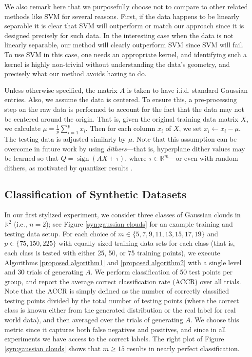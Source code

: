 \documentclass[twoside,11pt]{article}
\def \R {\mathbb{R}}
\DeclareMathOperator*{\sign}{sign}
\newcommand{\edit}[1]{{{#1}}}
\begin{document}
\edit{We also remark here that we purposefully choose not to compare to other related methods like SVM for several reasons. First, if the data happens to be linearly separable it is clear that SVM will outperform or match our approach since it is designed precisely for such data.  In the interesting case when the data is not linearly separable, our method will clearly outperform SVM since SVM will fail. To use SVM in this case, one needs an appropriate kernel, and identifying such a kernel is highly non-trivial without understanding the data's geometry, and precisely what our method avoids having to do.}

\edit{Unless otherwise specified}, the matrix $A$ is taken to have i.i.d. standard Gaussian entries. Also, we assume the data is centered. To ensure this, a pre-processing step on the raw data is performed to account for the fact that the data may not be centered around the origin. That is, given the original training data matrix $X$, we calculate $\mu = \frac{1}{p} \sum_{i=1}^p x_i$. Then for each column $x_i$ of $X$, we set $x_i \leftarrow x_i - \mu$. The testing data is adjusted similarly by $\mu$. Note that this assumption can be overcome in future work by using \textit{dithers}---that is, hyperplane dither values may be learned so that $Q = \sign(AX + \tau)$, where $\tau\in\R^m$---or \edit{even with random dithers, as motivated by quantizer results  \citep{exponentialBFNPW14,cambareri2017rare}}.

\subsection{Classification of Synthetic Datasets}
In our first stylized experiment, we consider three classes of Gaussian clouds in $\R^2$ (i.e., $n=2$); see Figure \ref{syn:gaussian clouds} for an example training and testing data setup. For each choice of $m\in\{5,7,9,11,13,15,17,19\}$ and $p\in\{75,150,225\}$ with equally sized training data sets for each class (that is, each class is tested with either 25, 50, or 75 training points), 
 we execute Algorithms \ref{proposed algorithm1} and \ref{proposed algorithm2} with a single \edit{level} and 30 trials of generating $A$. We perform classification of 50 test points per group, and report the average correct classification rate \edit{(ACCR)} over all trials. \edit{Note that the ACCR is simply defined as the number of correctly classified testing points divided by the total number of testing points (where the correct class is known either from the generated distribution or the real label for real world data), and then averaged over the trials of generating $A$.  We choose this metric since it captures both false negatives and positives, and since in all experiments we have access to the correct labels.} The right plot of Figure \ref{syn:gaussian clouds} shows that $m\geq 15$ results in nearly perfect classification. 
\end{document}
